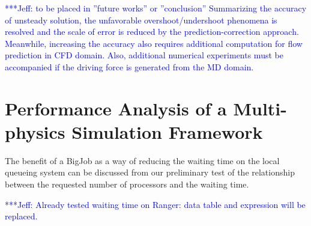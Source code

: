 \documentclass[preprint,12pt]{elsarticle}
\newcommand{\skonote}[1]{ {\textcolor{blue} { ***Jeff: #1 }}}
\newcommand{\skonote}[1]{}
\begin{document}
\skonote{to be placed in ''future works'' or ''conclusion''
Summarizing the accuracy of unsteady solution, the unfavorable overshoot/undershoot phenomena is resolved and the scale of error is reduced by the prediction-correction approach. Meanwhile, increasing the accuracy also requires additional computation for flow prediction in CFD domain. Also, additional numerical experiments must be accompanied if the driving force is generated from the MD domain.}



\section{Performance Analysis of a Multi-physics Simulation Framework}

The benefit of a BigJob as a way of reducing the waiting time on the local queueing system can be discussed from our preliminary test of the relationship between the requested number of processors and the waiting time.
\newline

\skonote{Already tested waiting time on Ranger: data table and expression will be replaced.}
\end{document}
